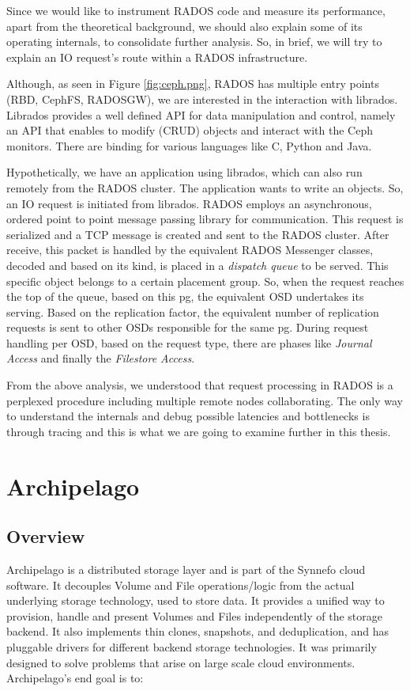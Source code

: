 Since we would like to instrument RADOS code and measure its performance, apart
from the theoretical background, we should also explain some of its operating
internals, to consolidate further analysis. So, in brief, we will try to explain
an IO request's route within a RADOS infrastructure.

Although, as seen in Figure \ref{fig:ceph.png}, RADOS has multiple entry points
(RBD, CephFS, RADOSGW), we are interested in the interaction with librados.
Librados provides a well defined API for data manipulation and control, namely
an API that enables to modify (CRUD) objects and interact with the Ceph
monitors. There are binding for various languages like C, Python and Java. 

Hypothetically, we have an application using librados, which can also run
remotely from the RADOS cluster. The application wants to write an objects. So,
an IO request is initiated from librados. RADOS employs an asynchronous, ordered
point to point message passing library for communication. This request is
serialized and a TCP message is created and sent to the RADOS cluster. After
receive, this packet is handled by the equivalent RADOS Messenger classes,
decoded and based on its kind, is placed in a \textit{dispatch queue} to be
served. This specific object belongs to a certain placement group. So, when the
request reaches the top of the queue, based on this pg, the equivalent OSD
undertakes its serving. Based on the replication factor, the equivalent number
of replication requests is sent to other OSDs responsible for the same pg.
During request handling per OSD, based on the request type, there are phases
like \textit{Journal Access} and finally the \textit{Filestore Access}.

From the above analysis, we understood that request processing in RADOS is a
perplexed procedure including multiple remote nodes collaborating. The only way
to understand the internals and debug possible latencies and bottlenecks is
through tracing and this is what we are going to examine further in this thesis.

\section{Archipelago}\label{sec:archip-bkg}

\subsection{Overview}
Archipelago is a distributed storage layer and is part of the Synnefo cloud
software. It decouples Volume and File operations/logic from the actual
underlying storage technology, used to store data. It provides a unified way to
provision, handle and present Volumes and Files independently of the storage
backend. It also implements thin clones, snapshots, and deduplication, and has
pluggable drivers for different backend storage technologies. It was primarily
designed to solve problems that arise on large scale cloud environments.
Archipelago's end goal is to:

